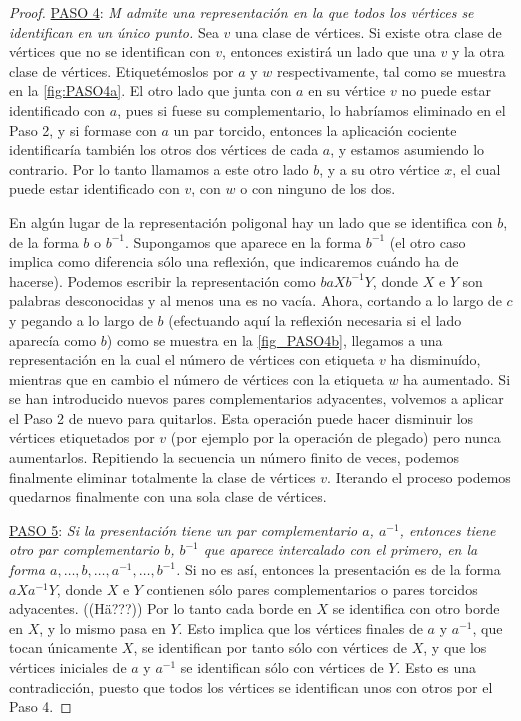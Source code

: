 \documentclass[10pt]{report}
\theoremstyle{definition}
\begin{document}
\begin{proof}
\underline{PASO 4}: \textit{M admite una representación en la que todos los vértices se identifican en un único punto.} Sea $v$ una clase de vértices. Si existe otra clase de vértices que no se identifican con $v$, entonces existirá un lado que una $v$ y la otra clase de vértices. Etiquetémoslos por $a$ y $w$ respectivamente, tal como se muestra en la \autoref{fig:PASO4a}. El otro lado que junta con $a$ en su vértice $v$ no puede estar identificado con $a$, pues si fuese su complementario, lo habríamos eliminado en el Paso 2, y si formase con $a$ un par torcido, entonces la aplicación cociente identificaría también los otros dos vértices de cada $a$, y estamos asumiendo lo contrario. Por lo tanto llamamos a este otro lado $b$, y a su otro vértice $x$, el cual puede estar identificado con $v$, con $w$ o con ninguno de los dos.

En algún lugar de la representación poligonal hay un lado que se identifica con $b$, de la forma $b$ o $b^{-1}$. Supongamos que aparece en la forma $b^{-1}$ (el otro caso implica como diferencia sólo una reflexión, que indicaremos cuándo ha de hacerse). Podemos escribir la representación como $baXb^{-1}Y$, donde $X$ e $Y$ son palabras desconocidas y al menos una es no vacía. Ahora, cortando a lo largo de $c$ y pegando a lo largo de $b$ (efectuando aquí la reflexión necesaria si el lado aparecía como $b$) como se muestra en la \autoref{fig_PASO4b}, llegamos a una representación en la cual el número de vértices con etiqueta $v$ ha disminuído, mientras que en cambio el número de vértices con la etiqueta $w$ ha aumentado. Si se han introducido nuevos pares complementarios adyacentes, volvemos a aplicar el Paso 2 de nuevo para quitarlos. Esta operación puede hacer disminuir los vértices etiquetados por $v$ (por ejemplo por la operación de plegado) pero nunca aumentarlos. Repitiendo la secuencia un número finito de veces, podemos finalmente eliminar totalmente la clase de vértices $v$. Iterando el proceso podemos quedarnos finalmente con una sola clase de vértices.

\underline{PASO 5}: \textit{Si la presentación tiene un par complementario $a$, $a^{-1}$, entonces tiene otro par complementario $b$,  $b^{-1}$ que aparece intercalado con el primero, en la forma $a,\dots , b, \dots ,a^{-1}, \dots , b^{-1} $.} Si no es así, entonces la presentación es de la forma $aXa^{-1}Y$, donde $X$ e $Y$ contienen sólo pares complementarios o pares torcidos adyacentes. ((Hä???)) Por lo tanto cada borde en $X$ se identifica con otro borde en $X$, y lo mismo pasa en $Y$. Esto implica que los vértices finales de $a$ y $a^{-1}$, que tocan únicamente $X$, se identifican por tanto sólo con vértices de $X$, y que los vértices iniciales de $a$ y $a^{-1}$ se identifican sólo con vértices de $Y$. Esto es una contradicción, puesto que todos los vértices se identifican unos con otros por el Paso 4.


\end{proof}
\end{document}
